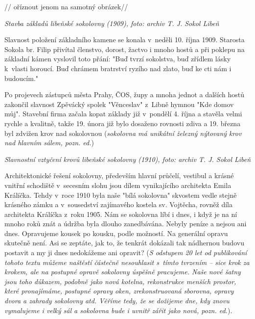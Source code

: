 \documentclass[a5paper, 12pt, twoside]{article}
\begin{document}

// oříznout jenom na samotný obrázek//

\textit{Stavba základů libeňské sokolovny (1909), foto: archiv T. J. Sokol
Libeň}

Slavnost položení základního kamene se konala v~neděli 10. října 1909.
Starosta Sokola br. Filip přivítal členstvo, dorost, žactvo i mnoho
hostů a při poklepu na základní kámen vyslovil toto přání: "Buď tvrzí
sokolstva, buď zřídlem lásky k~vlasti horoucí. Buď chrámem bratrství
ryzího nad zlato, buď ke cti nám i budoucím."

Po projevech zástupců města Prahy, ČOS, župy a mnoha jednot a dalších
hostů zakončil slavnost Zpěvácký spolek "Věnceslav" z~Libně hymnou "Kde
domov můj". Stavební firma začala kopat základy již v~pondělí 4. října
a stavěla velmi rychle a kvalitně, takže 19. února již bylo dosaženo
rovnosti zdiva a 19. března byl zdvižen krov nad sokolovnou
(\textit{sokolovna má unikátní železný nýtovaný krov nad hlavním sálem,
pozn. ed.})


\textit{Slavnostní vztyčení krovů libeňské sokolovny (1910), foto: archiv
T. J. Sokol Libeň}

Architektonické řešení sokolovny, především hlavní průčelí, vestibul a
krásné vnitřní schodiště v~secesním slohu jsou dílem vynikajícího
architekta Emila Králíčka. Tehdy v~roce 1910 byla naše "bílá sokolovna"
skvostem vedle stejně krásného zámku a v~sousedství zajímavého kostela
sv. Vojtěcha, rovněž díla architekta Králíčka z~roku 1905. Nám se
sokolovna líbí i dnes, i když je na ní mnoho roků znát a údržba byla
dlouho zanedbávána. Nebyly peníze a nejsou ani dnes. Opravujeme kousek
po kousku, podle možností. Na generální opravu skutečně není. Asi se
zeptáte, jak to, že tenkrát dokázali tak nádhernou budovu postavit a my
ji dnes nedokážeme ani opravit? (\textit{S odstupem 20 let od publikování
tohoto textu můžeme naštěstí částečně nesouhlasit s~tímto tvrzením --
sice krok za krokem, ale na postupné opravě sokolovny úspěšně pracujeme.
Naše nové šatny jsou toho důkazem, podobně jako nová kotelna,
rekonstrukce menších prostor, které pronajímáme, postupné opravy oken,
zrekonstruovaná sborovna, opravy dvora a zahrady sokolovny atd. Věříme
tedy, že se dožijeme dne, kdy znovu vymalujeme i velký sál a sokolovna
bude i uvnitř zářit jako nová, pozn. ed.}).
\end{document}
